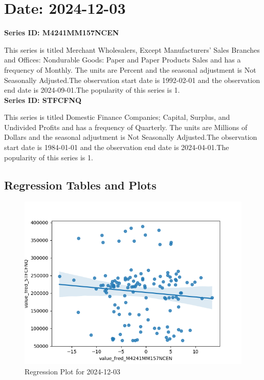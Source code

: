 \section{Date: 2024-12-03}
\noindent \textbf{Series ID: M4241MM157NCEN} 

\noindent This series is titled Merchant Wholesalers, Except Manufacturers' Sales Branches and Offices: Nondurable Goods: Paper and Paper Products Sales and has a frequency of Monthly. The units are Percent and the seasonal adjustment is Not Seasonally Adjusted.The observation start date is 1992-02-01 and the observation end date is 2024-09-01.The popularity of this series is 1. \\ 

\noindent \textbf{Series ID: STFCFNQ} 

\noindent This series is titled Domestic Finance Companies; Capital, Surplus, and Undivided Profits and has a frequency of Quarterly. The units are Millions of Dollars and the seasonal adjustment is Not Seasonally Adjusted.The observation start date is 1984-01-01 and the observation end date is 2024-04-01.The popularity of this series is 1. \\ 

\subsection{Regression Tables and Plots}


\begin{figure}
\centering
\includegraphics[scale = 0.9]{plots/plot_2024-12-03.png}
\caption{Regression Plot for 2024-12-03}
\end{figure}
\newpage
